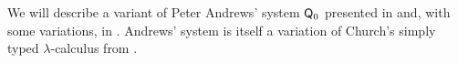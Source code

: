 \begin{definition}\label{def:simply_typed_hol}\mimprovised
  We will describe a variant of Peter Andrews' system \( \textsf{Q}_0 \) presented in \cite[\S 51]{Andrews2002Logic} and, with some variations, in . Andrews' system is itself a variation of Church's simply typed \( \lambda \)-calculus from \cite{Church1940STT}.

\end{definition}

\begin{definition}\label{def:nth_order_logic}
\end{definition}
